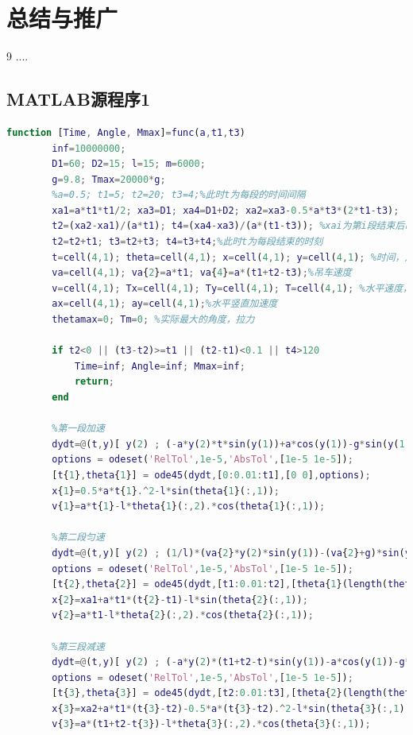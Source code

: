 \documentclass[withoutpreface,bwprint]{cumcmthesis} %
\begin{document}
\section{总结与推广}
\begin{thebibliography}{9}%
     ....
\end{thebibliography}
\begin{appendices}
    \section{MATLAB源程序1}

    \begin{lstlisting}[language=matlab]
        function [Time, Angle, Mmax]=func(a,t1,t3)
        inf=10000000;
        D1=60; D2=15; l=15; m=6000;
        g=9.8; Tmax=20000*g;
        %a=0.5; t1=5; t2=20; t3=4;%此时t为每段的时间间隔
        xa1=a*t1*t1/2; xa3=D1; xa4=D1+D2; xa2=xa3-0.5*a*t3*(2*t1-t3);
        t2=(xa2-xa1)/(a*t1); t4=(xa4-xa3)/(a*(t1-t3)); %xai为第i段结束后吊车的位移
        t2=t2+t1; t3=t2+t3; t4=t3+t4;%此时t为每段结束的时刻
        t=cell(4,1); theta=cell(4,1); x=cell(4,1); y=cell(4,1); %时间，角度，横纵坐标
        va=cell(4,1); va{2}=a*t1; va{4}=a*(t1+t2-t3);%吊车速度
        v=cell(4,1); Tx=cell(4,1); Ty=cell(4,1); T=cell(4,1); %水平速度，拉力,
        ax=cell(4,1); ay=cell(4,1);%水平竖直加速度
        thetamax=0; Tm=0; %实际最大的角度，拉力
        
        if t2<0 || (t3-t2)>=t1 || (t2-t1)<0.1 || t4>120
            Time=inf; Angle=inf; Mmax=inf;
            return;
        end
        
        %第一段加速
        dydt=@(t,y)[ y(2) ; (-a*y(2)*t*sin(y(1))+a*cos(y(1))-g*sin(y(1)))/l ];
        options = odeset('RelTol',1e-5,'AbsTol',[1e-5 1e-5]);
        [t{1},theta{1}] = ode45(dydt,[0:0.01:t1],[0 0],options);
        x{1}=0.5*a*t{1}.^2-l*sin(theta{1}(:,1));
        v{1}=a*t{1}-l*theta{1}(:,2).*cos(theta{1}(:,1));
        
        %第二段匀速
        dydt=@(t,y)[ y(2) ; (1/l)*(va{2}*y(2)*sin(y(1))-(va{2}+g)*sin(y(1))) ];
        options = odeset('RelTol',1e-5,'AbsTol',[1e-5 1e-5]);
        [t{2},theta{2}] = ode45(dydt,[t1:0.01:t2],[theta{1}(length(theta{1}(:,1)),1) theta{1}(length(theta{1}(:,2)),2)],options);
        x{2}=xa1+a*t1*(t{2}-t1)-l*sin(theta{2}(:,1));
        v{2}=a*t1-l*theta{2}(:,2).*cos(theta{2}(:,1));
        
        %第三段减速
        dydt=@(t,y)[ y(2) ; (-a*y(2)*(t1+t2-t)*sin(y(1))-a*cos(y(1))-g*sin(y(1)))/l ];
        options = odeset('RelTol',1e-5,'AbsTol',[1e-5 1e-5]);
        [t{3},theta{3}] = ode45(dydt,[t2:0.01:t3],[theta{2}(length(theta{2}(:,1)),1) theta{2}(length(theta{2}(:,2)),2)],options);
        x{3}=xa2+a*t1*(t{3}-t2)-0.5*a*(t{3}-t2).^2-l*sin(theta{3}(:,1));
        v{3}=a*(t1+t2-t{3})-l*theta{3}(:,2).*cos(theta{3}(:,1));
        

\end{lstlisting}
\end{appendices}
\end{document}
